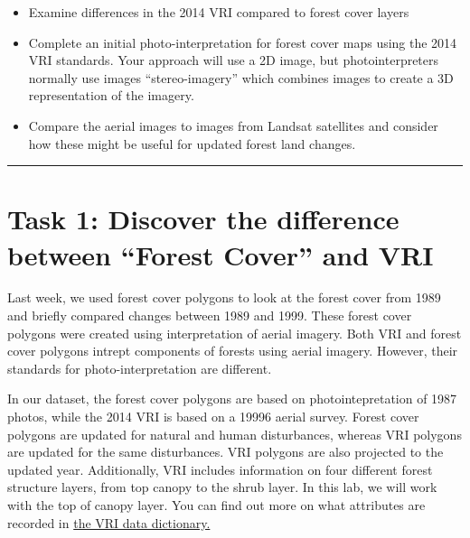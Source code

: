 \documentclass[
  letterpaper,
]{book}
\begin{document}

\begin{itemize}
\item
  Examine differences in the 2014 VRI compared to forest cover layers
\item
  Complete an initial photo-interpretation for forest cover maps using
  the 2014 VRI standards. Your approach will use a 2D image, but
  photointerpreters normally use images ``stereo-imagery'' which
  combines images to create a 3D representation of the imagery.
\item
  Compare the aerial images to images from Landsat satellites and
  consider how these might be useful for updated forest land changes.
\end{itemize}

\begin{center}\rule{0.5\linewidth}{0.5pt}\end{center}

\hypertarget{task-1-discover-the-difference-between-forest-cover-and-vri}{%
\section*{Task 1: Discover the difference between ``Forest Cover'' and
VRI}\label{task-1-discover-the-difference-between-forest-cover-and-vri}}


Last week, we used forest cover polygons to look at the forest cover
from 1989 and briefly compared changes between 1989 and 1999. These
forest cover polygons were created using interpretation of aerial
imagery. Both VRI and forest cover polygons intrept components of
forests using aerial imagery. However, their standards for
photo-interpretation are different.

In our dataset, the forest cover polygons are based on
photointepretation of 1987 photos, while the 2014 VRI is based on a
19996 aerial survey. Forest cover polygons are updated for natural and
human disturbances, whereas VRI polygons are updated for the same
disturbances. VRI polygons are also projected to the updated year.
Additionally, VRI includes information on four different forest
structure layers, from top canopy to the shrub layer. In this lab, we
will work with the top of canopy layer. You can find out more on what
attributes are recorded in
\href{https://www2.gov.bc.ca/assets/gov/farming-natural-resources-and-industry/forestry/stewardship/forest-analysis-inventory/data-management/standards/vegcomp_poly_rank1_data_dictionaryv5_2019.pdf}{the
VRI data dictionary.}
\end{document}
